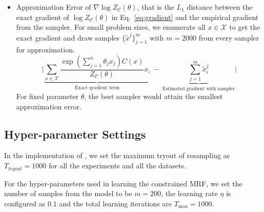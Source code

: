 \begin{itemize}
    \item Approximation Error of $\nabla \log Z_{\mathcal{C}}(\theta)$, that is the $L_1$ distance between the exact gradient of $ \log Z_{\mathcal{C}}(\theta)$ in Eq.~\eqref{eq:gradient} and the empirical gradient from the sampler. For small problem sizes, we enumerate all $x\in \mathcal{X}$ to get the exact gradient and draw samples $\{\tilde{x}^j\}_{j=1}^m$ with $m=2000$  from every sampler for approximation.
    \begin{equation*}
    \Big|\underbrace{\sum_{x\in\mathcal{X}} \frac{\exp\left( \sum_{j=1}^n\theta_jx_j\right)C(x) }{Z_\mathcal{C}(\theta)}{x_i}}_{\text{{Exact gradient term}}} \ - \ \underbrace{\sum_{j=1}^m \tilde{x}^j_i}_{\text{{Estimated gradient with sampler}}}\Big|
    \end{equation*}
    For fixed parameter $\theta$, the best sampler would attain the smallest approximation error.
\end{itemize}



\subsection{Hyper-parameter Settings} 
 In the implementation of \nls, we set the maximum tryout of resampling as $T_{tryout}=1000$ for all the experiments and all the datasets.

For the hyper-parameters used in learning the constrained MRF, we set the number of samples from the model to be $m=200$, the learning rate $\eta$ is configured as $0.1$ and the total learning iterations are $T_{\max}=1000$.




